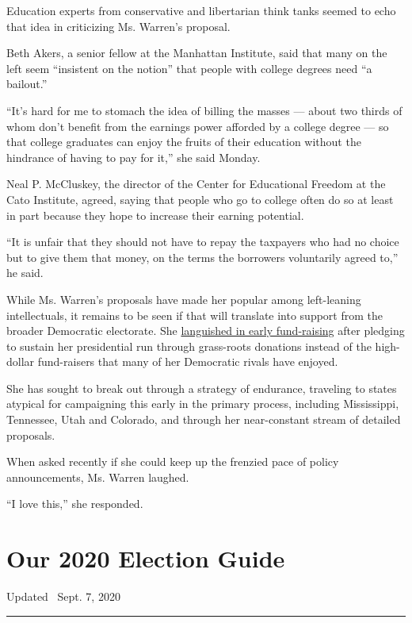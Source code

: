Education experts from conservative and libertarian think tanks seemed
to echo that idea in criticizing Ms. Warren's proposal.

Beth Akers, a senior fellow at the Manhattan Institute, said that many
on the left seem ``insistent on the notion'' that people with college
degrees need ``a bailout.''

``It's hard for me to stomach the idea of billing the masses --- about
two thirds of whom don't benefit from the earnings power afforded by a
college degree --- so that college graduates can enjoy the fruits of
their education without the hindrance of having to pay for it,'' she
said Monday.

Neal P. McCluskey, the director of the Center for Educational Freedom at
the Cato Institute, agreed, saying that people who go to college often
do so at least in part because they hope to increase their earning
potential.

``It is unfair that they should not have to repay the taxpayers who had
no choice but to give them that money, on the terms the borrowers
voluntarily agreed to,'' he said.

While Ms. Warren's proposals have made her popular among left-leaning
intellectuals, it remains to be seen if that will translate into support
from the broader Democratic electorate. She
\href{https://www.nytimes3xbfgragh.onion/2019/03/31/us/politics/elizabeth-warren-fundraising.html}{languished
in early fund-raising} after pledging to sustain her presidential run
through grass-roots donations instead of the high-dollar fund-raisers
that many of her Democratic rivals have enjoyed.

She has sought to break out through a strategy of endurance, traveling
to states atypical for campaigning this early in the primary process,
including Mississippi, Tennessee, Utah and Colorado, and through her
near-constant stream of detailed proposals.

When asked recently if she could keep up the frenzied pace of policy
announcements, Ms. Warren laughed.

``I love this,'' she responded.

\hypertarget{our-2020-election-guide}{%
\section{Our 2020 Election Guide}\label{our-2020-election-guide}}

Updated ~Sept. 7, 2020

\begin{center}\rule{0.5\linewidth}{\linethickness}\end{center}

